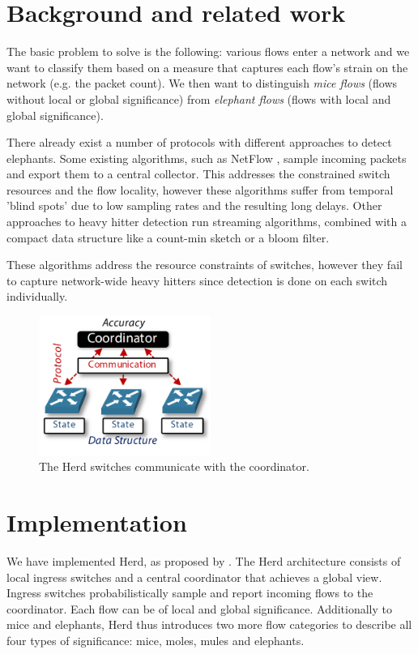 \documentclass[11pt,oneside,a4paper]{article}
\begin{document}
\section{Background and related work}

The basic problem to solve is the following: various flows enter a network and we want to classify them based on a measure that captures each flow's strain on the network (e.g. the packet count). We then want to distinguish \textit{mice flows} (flows without local or global significance) from \textit{elephant flows} (flows with local and global significance). 

There already exist a number of protocols with different approaches to detect elephants. Some existing algorithms, such as NetFlow \cite{claise2004netflow}, sample incoming packets and export them to a central collector. This addresses the constrained switch resources and the flow locality, however these algorithms suffer from temporal 'blind spots' due to low sampling rates and the resulting long delays. Other approaches to heavy hitter detection run streaming algorithms, combined with a compact data structure like a count-min sketch \cite{cormode2003countmin} or a bloom filter. 

These algorithms address the resource constraints of switches, however they fail to capture network-wide heavy hitters since detection is done on each switch individually.

\begin{figure}
	\centering
	\includegraphics[width=0.5\textwidth,scale=1]{figures/global_local_paper}
	\caption{The Herd switches communicate with the coordinator. \cite{anon2019herd}}
	\label{fig:global_fig}
\end{figure}

\section{Implementation}

We have implemented Herd, as proposed by \cite{anon2019herd}. The Herd architecture consists of local ingress switches and a central coordinator that achieves a global view. Ingress switches probabilistically sample and report incoming flows to the coordinator.
Each flow can be of local and global significance. Additionally to mice and elephants, Herd thus introduces two more flow categories to describe all four types of significance: mice, moles, mules and elephants.
\end{document}
